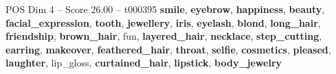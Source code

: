 \begin{textsample}{POS Dim 4 – Score 26.00 – t000395}  \label{ex:f4_pos_008}
\textbf{smile}, \textbf{eyebrow}, \textbf{happiness}, \textbf{beauty}, \textbf{facial\_expression}, \textbf{tooth}, \textbf{jewellery}, \textbf{iris}, \textbf{eyelash}, \textbf{blond}, \textbf{long\_hair}, \textbf{friendship}, \textbf{brown\_hair}, fun, \textbf{layered\_hair}, \textbf{necklace}, \textbf{step\_cutting}, \textbf{earring}, \textbf{makeover}, \textbf{feathered\_hair}, \textbf{throat}, \textbf{selfie}, \textbf{cosmetics}, \textbf{pleased}, \textbf{laughter}, lip\_gloss, \textbf{curtained\_hair}, \textbf{lipstick}, \textbf{body\_jewelry}

\end{textsample}

